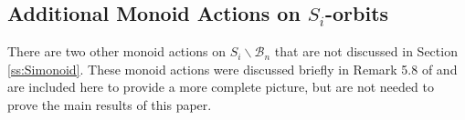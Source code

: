 \documentclass[12pt]{amsart}
\numberwithin{equation}{section}
\newcommand{\C}{\mbox{${\mathbb C}$}}
\newcommand{\B}{\mathcal{B}}
\begin{document}


 \subsection{Additional Monoid Actions on $S_{i}$-orbits}
There are two other monoid actions on $S_{i}\backslash\B_{n}$ that are not discussed in Section \ref{ss:Simonoid}.  %
These monoid actions were discussed briefly in Remark 5.8 of \cite{Siorbits} and are included here to provide a more complete picture, but are not needed to prove the main results of this paper.
\end{document}
